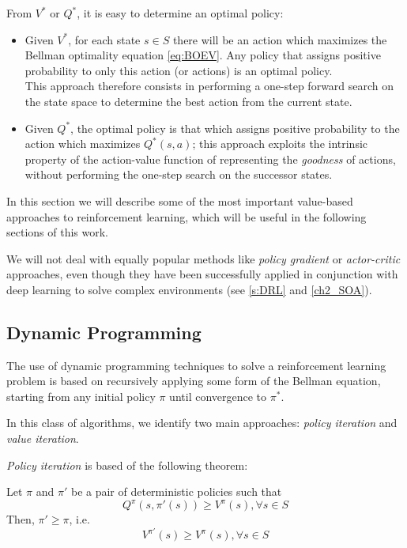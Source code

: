 From $V^*$ or $Q^*$, it is easy to determine an optimal policy:
\begin{itemize}
    \item Given $V^*$, for each state $s \in S$ there will be an action which 
    maximizes the Bellman optimality equation \eqref{eq:BOEV}. Any policy that 
    assigns positive probability to only this action (or actions) is an optimal 
    policy. \\
    This approach therefore consists in performing a one-step forward search on 
    the state space to determine the best action from the current state.
    \item Given $Q^*$, the optimal policy is that which assigns positive 
    probability to the action which maximizes $Q^*(s, a)$; this approach 
    exploits the intrinsic property of the action-value function of representing 
    the \textit{goodness} of actions, without performing the one-step search 
    on the successor states. 
\end{itemize}

In this section we will describe some of the most important value-based 
approaches to reinforcement learning, which will be useful in the following 
sections of this work. 

We will not deal with equally popular methods like \textit{policy gradient} or 
\textit{actor-critic} approaches, even though they have been successfully applied
in conjunction with deep learning to solve complex environments (see \ref{s:DRL}
and \ref{ch2_SOA}).

\subsection{Dynamic Programming}
The use of dynamic programming techniques to solve a reinforcement learning 
problem is based on recursively applying some form of the Bellman equation, 
starting from any initial policy $\pi$ until convergence to $\pi^*$.

In this class of algorithms, we identify two main approaches: \textit{policy 
iteration} and \textit{value iteration}.

\textit{Policy iteration} is based of the following theorem:
\begin{theorem} \label{th:pol_imp}
    Let $\pi$ and $\pi'$ be a pair of deterministic policies such that
    \[
        Q^\pi(s, \pi'(s)) \ge V^\pi(s), \forall s \in S 
    \]
    Then, $\pi' \ge \pi$, i.e. 
    \[
        V^{\pi'}(s) \ge V^{\pi}(s), \forall s \in S
    \]
\end{theorem}


